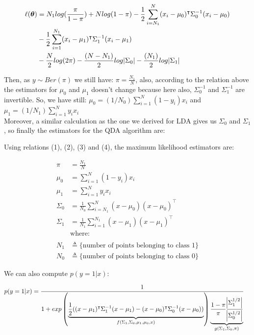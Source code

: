 \documentclass[11pt]{article}
\numberwithin{figure}{section} %
\begin{document}
\begin{align*}
\ell(\boldsymbol{\theta}) & = N_1 log(\frac{\pi}{1-\pi}) + N log(1-\pi)
- \frac{1}{2}\sum\limits_{i=N_1}^N (x_i - \mu_0)^{\intercal}\Sigma_0^{-1}(x_i -\mu_0) \\
& - \frac{1}{2}\sum\limits_{i=1}^{N_1} (x_i - \mu_1)^{\intercal}\Sigma_1^{-1}(x_i -\mu_1) \\
& - \frac{N}{2}log(2\pi) - \frac{(N-N_1)}{2}log\abs{\Sigma_0}
- \frac{(N_1)}{2}log\abs{\Sigma_1}
\end{align*}

Then, as $y \sim Ber(\pi)$ we still have: $\pi = \frac{N_1}{N}$, also, according to the relation above the estimators for $\mu_0$ and $\mu_1$ doesn't change because here also, $\Sigma_0^{-1}$ and $\Sigma_1^{-1}$ are invertible. So, we have still:
$\mu_0 = (1/N_0) \sum\limits_{i=1}^N (1-y_i) x_i$ and
$\mu_1 = (1/N_1) \sum\limits_{i=1}^N y_i x_i$ \\
Moreover, a similar calculation as the one we derived for LDA gives us $\Sigma_0$ and $\Sigma_1$, so finally the estimators for the QDA algorithm are:

\begin{tcolorbox}
Using relations (1), (2), (3) and (4), the maximum likelihood estimators are:

\begin{align*}
\pi & = \frac{N_1}{N} \\
\mu_0 & = \sum\limits_{i=1}^{N} (1 - y_i) x_i \\
\mu_1  & = \sum\limits_{i=1}^{N} y_i x_i \\
\Sigma_0 & = \frac{1}{N_0} \sum\limits_{i=N_1}^{N} (x- \mu_{0})(x-\mu_{0})^{\intercal} \\
\Sigma_1 & = \frac{1}{N_1} \sum\limits_{i=1}^{N_1} (x- \mu_{1})(x-\mu_{1})^{\intercal}\\
 & \text{where:} \\
\\
N_1 & \triangleq  \{\text{number of points belonging to class 1}\} \\
N_0 & \triangleq \{\text{number of points belonging to class 0}\}
\end{align*}

\end{tcolorbox}
\newpage
We can also compute $p(y=1|x)$:

\begin{align*}
p(y=1|x) & = \frac{1}{1 + exp \left( \underbrace{\frac{1}{2}((x-\mu_1)^{\intercal}\Sigma_1^{-1}(x-\mu_1) - (x-\mu_0)^{\intercal}\Sigma_0^{-1}(x-\mu_0))}_{f(\Sigma_1,\Sigma_0, \mu_1, \mu_0, x)} \right)\underbrace{\frac{1-\pi}{\pi}\frac{\abs{\Sigma_1^{1/2}}}{\abs{\Sigma_0^{1/2}}}}_{g(\Sigma_1,\Sigma_0, \pi)}}
\end{align*}
\end{document}
